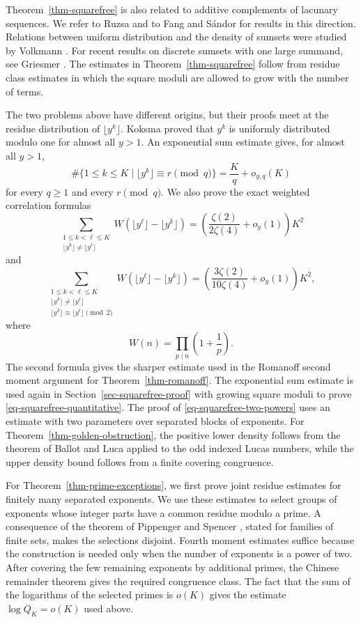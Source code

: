 \documentclass[11pt,reqno]{amsart}
\numberwithin{equation}{section}
\begin{document}
    Theorem~\ref{thm-squarefree} is also related to additive complements of lacunary sequences. We refer to Ruzsa \cite{Ruzsa2001,Ruzsa2017} and to Fang and S\'andor \cite{FangSandor} for results in this direction. Relations between uniform distribution and the density of sumsets were studied by Volkmann \cite{Volkmann}. For recent results on discrete sumsets with one large summand, see Griesmer \cite{Griesmer}. The estimates in Theorem~\ref{thm-squarefree} follow from residue class estimates in which the square moduli are allowed to grow with the number of terms.

    The two problems above have different origins, but their proofs meet at the residue distribution of $\lfloor y^k\rfloor$. Koksma \cite{Koksma} proved that $y^k$ is uniformly distributed modulo one for almost all $y>1$. An exponential sum estimate gives, for almost all $y>1$,
    $$
    \#\{1\le k\le K\mid \lfloor y^k\rfloor\equiv r\pmod q\}
    =\frac Kq+o_{y,q}(K)
    $$
    for every $q\ge1$ and every $r\pmod q$. We also prove the exact weighted correlation formulas
    $$
    \sum_{\substack{1\le k<\ell\le K\\
            \lfloor y^k\rfloor\ne\lfloor y^\ell\rfloor}}
    W\!\left(\lfloor y^\ell\rfloor-\lfloor y^k\rfloor\right)
    =\left(\frac{\zeta(2)}{2\zeta(4)}+o_y(1)\right)K^2
    $$
    and
    $$
    \sum_{\substack{1\le k<\ell\le K\\
            \lfloor y^k\rfloor\ne\lfloor y^\ell\rfloor\\
            \lfloor y^k\rfloor\equiv\lfloor y^\ell\rfloor\pmod2}}
    W\!\left(\lfloor y^\ell\rfloor-\lfloor y^k\rfloor\right)
    =\left(\frac{3\zeta(2)}{10\zeta(4)}+o_y(1)\right)K^2,
    $$
    where
    $$
    W(n)=\prod_{p\mid n}\left(1+\frac1p\right).
    $$
    The second formula gives the sharper estimate used in the Romanoff second moment argument for Theorem~\ref{thm-romanoff}. The exponential sum estimate is used again in Section~\ref{sec-squarefree-proof} with growing square moduli to prove \eqref{eq-squarefree-quantitative}. The proof of \eqref{eq-squarefree-two-powers} uses an estimate with two parameters over separated blocks of exponents. For Theorem~\ref{thm-golden-obstruction}, the positive lower density follows from the theorem of Ballot and Luca applied to the odd indexed Lucas numbers, while the upper density bound follows from a finite covering congruence.

    For Theorem~\ref{thm-prime-exceptions}, we first prove joint residue estimates for finitely many separated exponents. We use these estimates to select groups of exponents whose integer parts have a common residue modulo a prime. A consequence of the theorem of Pippenger and Spencer \cite{PippengerSpencer}, stated for families of finite sets, makes the selections disjoint. Fourth moment estimates suffice because the construction is needed only when the number of exponents is a power of two. After covering the few remaining exponents by additional primes, the Chinese remainder theorem gives the required congruence class. The fact that the sum of the logarithms of the selected primes is $o(K)$ gives the estimate $\log Q_K=o(K)$ used above.
\end{document}
